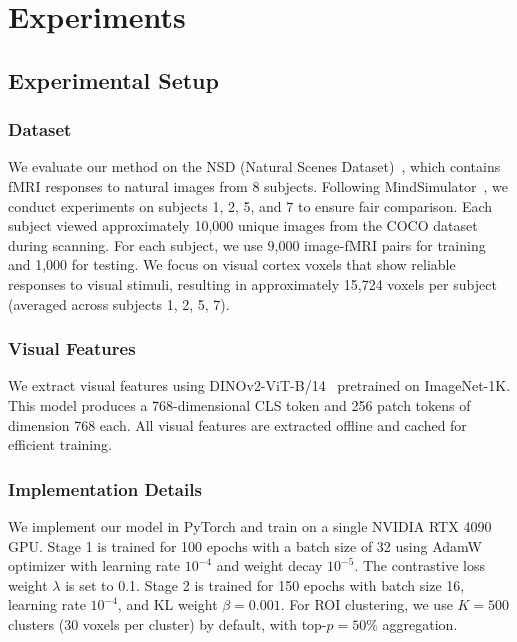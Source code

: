 
\section{Experiments}

\subsection{Experimental Setup}

\subsubsection{Dataset}
We evaluate our method on the NSD (Natural Scenes Dataset)~\cite{allen2022massive},
which contains fMRI responses to natural images from 8 subjects.
Following MindSimulator~\cite{mindsimulator}, we conduct experiments on subjects 1, 2, 5, and 7
to ensure fair comparison.
Each subject viewed approximately 10,000 unique images from the COCO dataset during scanning.
For each subject, we use 9,000 image-fMRI pairs for training and 1,000 for testing.
We focus on visual cortex voxels that show reliable responses to visual stimuli,
resulting in approximately 15,724 voxels per subject (averaged across subjects 1, 2, 5, 7).

\subsubsection{Visual Features}
We extract visual features using DINOv2-ViT-B/14~\cite{oquab2023dinov2} pretrained on ImageNet-1K.
This model produces a 768-dimensional CLS token and 256 patch tokens of dimension 768 each.
All visual features are extracted offline and cached for efficient training.

\subsubsection{Implementation Details}
We implement our model in PyTorch and train on a single NVIDIA RTX 4090 GPU.
Stage 1 is trained for 100 epochs with a batch size of 32 using AdamW optimizer
with learning rate $10^{-4}$ and weight decay $10^{-5}$.
The contrastive loss weight $\lambda$ is set to 0.1.
Stage 2 is trained for 150 epochs with batch size 16, learning rate $10^{-4}$,
and KL weight $\beta = 0.001$.
For ROI clustering, we use $K=500$ clusters (30 voxels per cluster) by default,
with top-$p=50\%$ aggregation.

